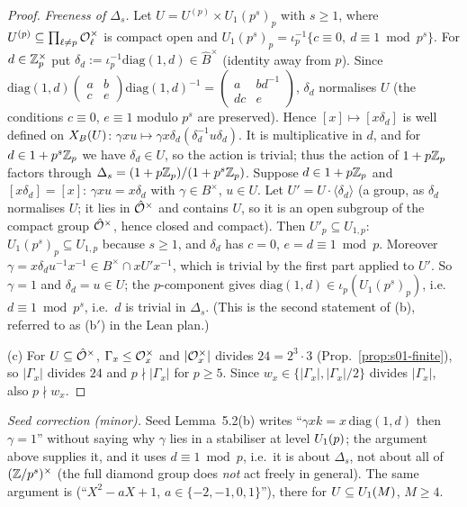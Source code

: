 \begin{proof}
\emph{Freeness of $\Delta_s$.} Let $U=U^{(p)}\times U_1(p^s)_p$ with $s\ge1$, where $U^{(p)}\subseteq\prod_{\ell\ne p}\mathcal{O}_\ell^\times$ is
compact open and $U_1(p^s)_p=\iota_p^{-1}\{c\equiv0,\ d\equiv1\bmod p^s\}$. For $d\in\mathbb{Z}_p^\times$ put
$\delta_d:=\iota_p^{-1}\mathrm{diag}(1,d)\in\hat B^\times$ (identity away from $p$). Since
$\mathrm{diag}(1,d)\left(\begin{smallmatrix}a&b\\c&e\end{smallmatrix}\right)\mathrm{diag}(1,d)^{-1}=\left(\begin{smallmatrix}a&bd^{-1}\\dc&e\end{smallmatrix}\right)$,
$\delta_d$ normalises $U$ (the conditions $c\equiv0$, $e\equiv1$ modulo $p^s$ are preserved). Hence $[x]\mapsto[x\delta_d]$ is well defined on
$X_B(U)$: $\gamma xu\mapsto\gamma x\delta_d(\delta_d^{-1}u\delta_d)$. It is multiplicative in $d$, and for $d\in1+p^s\mathbb{Z}_p$ we have $\delta_d\in U$, so the action
is trivial; thus the action of $1+p\mathbb{Z}_p$ factors through $\Delta_s=(1+p\mathbb{Z}_p)/(1+p^s\mathbb{Z}_p)$.
Suppose $d\in1+p\mathbb{Z}_p$ and $[x\delta_d]=[x]$: $\gamma xu=x\delta_d$ with $\gamma\in B^\times$, $u\in U$. Let $U'=U\cdot\langle\delta_d\rangle$ (a group,
as $\delta_d$ normalises $U$; it lies in $\hat{\mathcal{O}}^\times$ and contains $U$, so it is an open subgroup of the compact group $\hat{\mathcal{O}}^\times$, hence closed and compact). Then $U'_p\subseteq U_{1,p}$: $U_1(p^s)_p\subseteq U_{1,p}$ because $s\ge1$,
and $\delta_d$ has $c=0$, $e=d\equiv1\bmod p$. Moreover $\gamma=x\delta_du^{-1}x^{-1}\in B^\times\cap xU'x^{-1}$, which is trivial by the first part
applied to $U'$. So $\gamma=1$ and $\delta_d=u\in U$; the $p$-component gives $\mathrm{diag}(1,d)\in\iota_p(U_1(p^s)_p)$, i.e.\ $d\equiv1\bmod p^s$, i.e.\ $d$ is trivial in $\Delta_s$.
(This is the second statement of (b), referred to as (b$'$) in the Lean plan.)

(c) For $U\subseteq\hat{\mathcal{O}}^\times$, $\Gamma_x\le\mathcal{O}_x^\times$ and $|\mathcal{O}_x^\times|$ divides $24=2^3\cdot3$ (Prop.~\ref{prop:s01-finite}), so
$|\Gamma_x|$ divides $24$ and $p\nmid|\Gamma_x|$ for $p\ge5$. Since $w_x\in\{|\Gamma_x|,|\Gamma_x|/2\}$ divides $|\Gamma_x|$, also $p\nmid w_x$.
\end{proof}
\noindent\emph{Seed correction (minor).} Seed Lemma~5.2(b) writes ``$\gamma xk=x\,\mathrm{diag}(1,d)$ then $\gamma=1$''
without saying why $\gamma$ lies in a stabiliser at level $U_1(p)$; the argument above supplies it, and it uses $d\equiv1\bmod p$,
i.e.\ it is about $\Delta_s$, not about all of $(\mathbb{Z}/p^s)^\times$ (the full diamond group does \emph{not} act freely in
general). The same argument is 
(``$X^2-aX+1$, $a\in\{-2,-1,0,1\}$''), there for $U\subseteq U_1(M)$, $M\ge4$.


